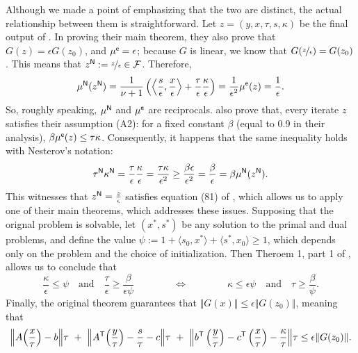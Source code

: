 \begin{subappendices}
\begin{lproof}
    Although we made a point of emphasizing that the two are distinct,
    the actual relationship between them is straightforward.
    Let $z = (y, x,\tau, s, \kappa)$ be the final output of \textcite{badenbroek2021algorithm}.
    In proving their main theorem, they also prove that
    $G(z) = \epsilon G(z_0)$,  and $\mu^{\sf e}=\epsilon$;
    because $G$ is linear, we know that $G(\nicefrac{z}{\epsilon}) = G(z_0)$.
    This means that $z^{\sf N}
    := \nicefrac z\epsilon \in \mathcal F$.
    Therefore,
    \[
        \mu^{\sf N}(z^{\sf N} )
        = \frac{1}{\nu+1} \left( \left\langle\frac{s}{\epsilon}, \frac{x}{\epsilon}\right\rangle + \frac{\tau}{\epsilon} \frac{\kappa}{\epsilon} \right)
    = \frac{1}{\epsilon^2} \mu^{\sf e}(z) = \frac{1}{\epsilon}.
    \]
    So, roughly speaking, $\mu^{\sf N}$ and $\mu^{\sf e}$ are reciprocals.
    \citeauthor*{badenbroek2021algorithm} also
    prove that, every iterate $z$ satisfies their assumption (A2): for a fixed constant $\beta$ (equal to 0.9 in their analysis), $\beta \mu^{\sf e}(z) \le \tau \kappa$.
    Consequently,
    it happens that the same inequality holds with Nesterov's notation:
    \[
        \tau^{\sf N} \kappa^{\sf N} =
        \frac{\tau}{\epsilon} \frac{\kappa}{\epsilon}
            = \frac{\tau\kappa}{\epsilon^2} \ge \frac{\beta \epsilon}{\epsilon^2}
            = \frac\beta\epsilon = \beta \mu^{\sf N}
                (z^{\sf N}).
    \]
    This witnesses that $z^{\sf N} = \frac{z}{\epsilon}$ satisfies equation (81) of \citeauthor{nesterov1996infeasible}, which allows us to apply one of their main theorems, which addresses these issues.
    Supposing that the orignal problem is solvable,
    let $(x^*, s^*)$ be any solution to the primal and dual problems,
    and define the value $\psi := 1 + \langle s_0, x^*\rangle + \langle s^*, x_0 \rangle \ge 1$,
    which depends only on the problem and the choice of initialization.
    Then Theroem 1, part 1 of \citeauthor*{nesterov1996infeasible}, allows us to conclude that
    \[
        \frac{\kappa}{\epsilon}  \le \psi
        \quad\text{and}\quad
        \frac\tau\epsilon \ge \frac{\beta}{\epsilon\psi}
    \qquad\qquad \iff\qquad\qquad
        \kappa \le \epsilon\psi
        \quad\text{and}\quad \tau \ge \frac\beta\psi.
    \]
    Finally, the original theorem guarantees that
    $\Vert G(x) \Vert \le \epsilon \Vert G(z_0)\Vert$, meaning that
    \[
        \Big\Vert A \Big(\frac x\tau\Big) - b \Big\Vert \tau
        ~+~\Big\Vert A^{\sf T} \Big(\frac y\tau\Big) - \frac{s}\tau - c \Big\Vert \tau
        ~+~\Big\Vert b^{\sf T} \left(\frac{y}{\tau}\right) - c^{\sf T} \left(\frac{x}{\tau}\right) - \frac\kappa\tau \Big\Vert \tau \le \epsilon \Vert G(z_0) \Vert.
\]
\end{lproof}
\end{subappendices}
